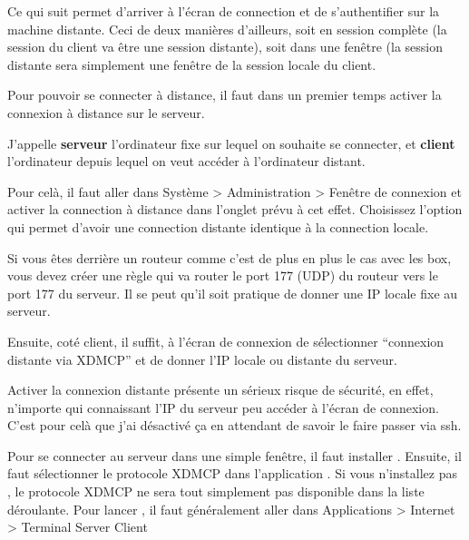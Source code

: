 \documentclass[a4paper,twoside]{article}
\begin{document}
Ce qui suit permet d'arriver à l'écran de connection et de s'authentifier sur la machine distante. Ceci de deux manières d'ailleurs, soit en session complète (la session du client va être une session distante), soit dans une fenêtre (la session distante sera simplement une fenêtre de la session locale du client.

\bigskip

Pour pouvoir se connecter à distance, il faut dans un premier temps activer la connexion à distance sur le serveur.

\begin{remarque}
J'appelle \textbf{serveur} l'ordinateur fixe sur lequel on souhaite se connecter, et \textbf{client} l'ordinateur depuis lequel 
on veut accéder à l'ordinateur distant.
\end{remarque}

Pour celà, il faut aller dans Système > Administration > Fenêtre de connexion et activer la connection à distance dans l'onglet prévu à cet effet. Choisissez l'option qui permet d'avoir une connection distante identique à la connection locale.

Si vous êtes derrière un routeur comme c'est de plus en plus le cas avec les box, vous devez créer une règle qui va router le port 177 (UDP) du routeur vers le port 177 du serveur. Il se peut qu'il soit pratique de donner une IP locale fixe au serveur.

\bigskip

Ensuite, coté client, il suffit, à l'écran de connexion de sélectionner ``connexion distante via XDMCP'' et de donner l'IP locale ou distante du serveur.

\begin{attention}
Activer la connexion distante présente un sérieux risque de sécurité, en effet, n'importe qui connaissant l'IP du serveur peu accéder à l'écran de connexion. C'est pour celà que j'ai désactivé ça en attendant de savoir le faire passer via ssh.
\end{attention}

Pour se connecter au serveur dans une simple fenêtre, il faut installer . Ensuite, il faut sélectionner le protocole XDMCP dans l'application . Si vous n'installez pas , le protocole XDMCP ne sera tout simplement pas disponible dans la liste déroulante. Pour lancer , il faut généralement aller dans Applications > Internet > Terminal Server Client
\end{document}
